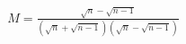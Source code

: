 \documentclass[preview]{standalone}
\begin{document}
\begin{align*}
M = \frac{\sqrt{n}-\sqrt{n-1}} {(\sqrt{n}+\sqrt{n-1})(\sqrt{n}-\sqrt{n-1})}
\end{align*}
\end{document}
